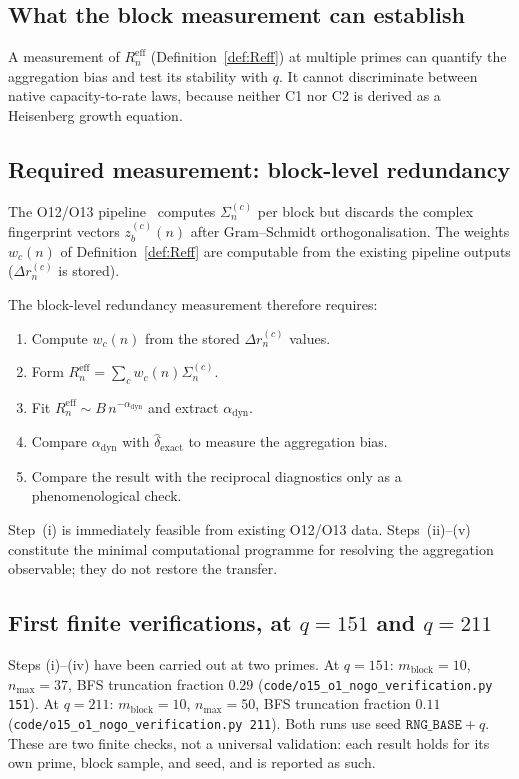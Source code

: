 \documentclass[11pt,a4paper]{article}
\newcommand{\dexact}{\hat{\delta}_{\mathrm{exact}}}
\newcommand{\Reff}{R_n^{\mathrm{eff}}}
\begin{document}
\subsection{What the block measurement can establish}

A measurement of $\Reff$ (Definition~\ref{def:Reff}) at multiple primes can quantify the
aggregation bias and test its stability with $q$.
It cannot discriminate between native capacity-to-rate laws, because neither C1 nor C2 is
derived as a Heisenberg growth equation.

\subsection{Required measurement: block-level redundancy}

The O12/O13 pipeline~\cite{Beau2026a16,Beau2026a17} computes
$\Sigma_n^{(c)}$ per block but discards the complex fingerprint
vectors $z_b^{(c)}(n)$ after Gram--Schmidt orthogonalisation.
The weights $w_c(n)$ of Definition~\ref{def:Reff} are computable
from the existing pipeline outputs ($\Delta r_n^{(c)}$ is stored).

The block-level redundancy measurement therefore requires:
\begin{enumerate}[label=(\roman*)]
\item Compute $w_c(n)$ from the stored $\Delta r_n^{(c)}$ values.
\item Form $\Reff = \sum_c w_c(n) \Sigma_n^{(c)}$.
\item Fit $\Reff \sim B \, n^{-\alpha_{\mathrm{dyn}}}$ and extract
$\alpha_{\mathrm{dyn}}$.
\item Compare $\alpha_{\mathrm{dyn}}$ with $\dexact$ to measure the
aggregation bias.
\item Compare the result with the reciprocal diagnostics only as a phenomenological check.
\end{enumerate}

Step~(i) is immediately feasible from existing O12/O13 data.
Steps~(ii)--(v) constitute the minimal computational programme for resolving the aggregation
observable; they do not restore the transfer.

\subsection{First finite verifications, at \texorpdfstring{$q=151$ and $q=211$}{q=151 and q=211}}
\label{sec:q151}

Steps (i)--(iv) have been carried out at two primes.
At $q=151$: $m_{\mathrm{block}}=10$, $n_{\mathrm{max}}=37$, BFS truncation
fraction $0.29$ (\texttt{code/o15\_o1\_nogo\_verification.py 151}).
At $q=211$: $m_{\mathrm{block}}=10$, $n_{\mathrm{max}}=50$, BFS truncation
fraction $0.11$ (\texttt{code/o15\_o1\_nogo\_verification.py 211}).
Both runs use seed $\texttt{RNG\_BASE}+q$.
These are two finite checks, not a universal validation: each result holds
for its own prime, block sample, and seed, and is reported as such.
\end{document}
